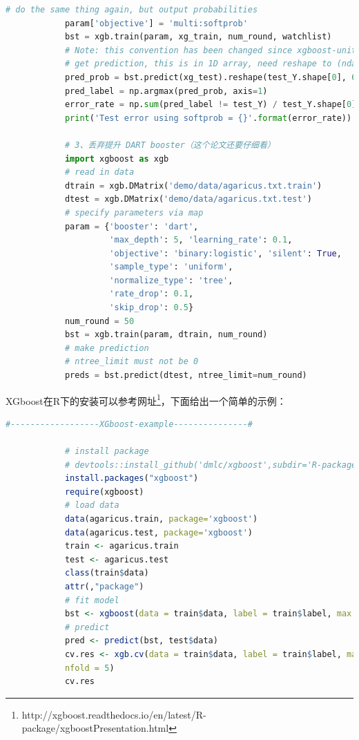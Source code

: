 \begin{lstlisting}[language = Python]
            # do the same thing again, but output probabilities
            param['objective'] = 'multi:softprob'
            bst = xgb.train(param, xg_train, num_round, watchlist)
            # Note: this convention has been changed since xgboost-unity
            # get prediction, this is in 1D array, need reshape to (ndata, nclass)
            pred_prob = bst.predict(xg_test).reshape(test_Y.shape[0], 6)
            pred_label = np.argmax(pred_prob, axis=1)
            error_rate = np.sum(pred_label != test_Y) / test_Y.shape[0]
            print('Test error using softprob = {}'.format(error_rate))

            # 3、丢弃提升 DART booster（这个论文还要仔细看）
            import xgboost as xgb
            # read in data
            dtrain = xgb.DMatrix('demo/data/agaricus.txt.train')
            dtest = xgb.DMatrix('demo/data/agaricus.txt.test')
            # specify parameters via map
            param = {'booster': 'dart',
                     'max_depth': 5, 'learning_rate': 0.1,
                     'objective': 'binary:logistic', 'silent': True,
                     'sample_type': 'uniform',
                     'normalize_type': 'tree',
                     'rate_drop': 0.1,
                     'skip_drop': 0.5}
            num_round = 50
            bst = xgb.train(param, dtrain, num_round)
            # make prediction
            # ntree_limit must not be 0
            preds = bst.predict(dtest, ntree_limit=num_round)
            \end{lstlisting}
            \par
            XGboost在R下的安装可以参考网址\footnote{http://xgboost.readthedocs.io/en/latest/R-package/xgboostPresentation.html}，下面给出一个简单的示例：
            \begin{lstlisting}[language = R]
            #------------------XGboost-example---------------#

            # install package
            # devtools::install_github('dmlc/xgboost',subdir='R-package')
            install.packages("xgboost")
            require(xgboost)
            # load data
            data(agaricus.train, package='xgboost')
            data(agaricus.test, package='xgboost')
            train <- agaricus.train
            test <- agaricus.test
            class(train$data)
            attr(,"package")
            # fit model
            bst <- xgboost(data = train$data, label = train$label, max.depth = 2, eta = 1,nround = 2, objective = "binary:logistic")
            # predict
            pred <- predict(bst, test$data)
            cv.res <- xgb.cv(data = train$data, label = train$label, max.depth = 2, eta = 1, nround = 2, objective = "binary:logistic",
            nfold = 5)
            cv.res
            \end{lstlisting}

